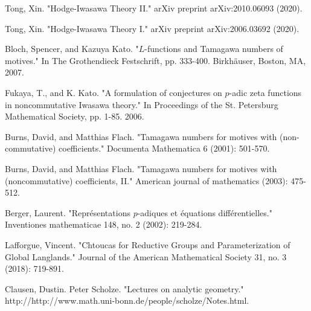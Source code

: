 \documentclass[12pt]{amsart}
\theoremstyle{definition}
\numberwithin{equation}{section}
\begin{document}
\begin{thebibliography}{10}
 Tong, Xin. "Hodge-Iwasawa Theory II." arXiv preprint arXiv:2010.06093 (2020). 

 Tong, Xin. "Hodge-Iwasawa Theory I." arXiv preprint arXiv:2006.03692 (2020).

 Bloch, Spencer, and Kazuya Kato. "$L$-functions and Tamagawa numbers of motives." In The Grothendieck Festschrift, pp. 333-400. Birkh\"auser, Boston, MA, 2007.


 Fukaya, T., and K. Kato. "A formulation of conjectures on $p$-adic zeta functions in noncommutative Iwasawa theory." In Proceedings of the St. Petersburg Mathematical Society, pp. 1-85. 2006.


 Burns, David, and Matthias Flach. "Tamagawa numbers for motives with (non-commutative) coefficients." Documenta Mathematica 6 (2001): 501-570.

 Burns, David, and Matthias Flach. "Tamagawa numbers for motives with (noncommutative) coefficients, II." American journal of mathematics (2003): 475-512.


 Berger, Laurent. "Repr\'esentations $p$-adiques et \'equations diff\'erentielles." Inventiones mathematicae 148, no. 2 (2002): 219-284.

 Lafforgue, Vincent. "Chtoucas for Reductive Groups and Parameterization of Global Langlands." Journal of the American Mathematical Society 31, no. 3 (2018): 719-891.

 Clausen, Dustin. Peter Scholze. "Lectures on analytic geometry." http://http://www.math.uni-bonn.de/people/scholze/Notes.html.




\end{thebibliography}



%
\end{document}
